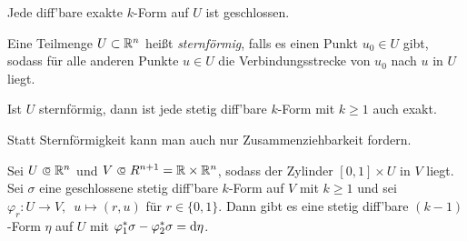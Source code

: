 \documentclass{cheat-sheet}
\begin{document}
\begin{beobachtung}
  Jede diff'bare exakte $k$-Form auf $U$ ist geschlossen.
\end{beobachtung}


\begin{defn}
  Eine Teilmenge $U \subset \mathbb{R}^n$ heißt \emph{sternförmig}, falls es einen Punkt $u_0 \in U$ gibt, sodass für alle anderen Punkte $u \in U$ die Verbindungsstrecke von $u_0$ nach $u$ in $U$ liegt.
\end{defn}

\begin{lem}[Poincaré]
  Ist $U$ sternförmig, dann ist jede stetig diff'bare $k$-Form mit $k \geq 1$ auch exakt.
\end{lem}

\begin{bem}
  Statt Sternförmigkeit kann man auch nur Zusammenziehbarkeit fordern.
\end{bem}


\begin{lem}
  Sei $U \opn \R^n$ und $V \opn R^{n{+}1} = \R \times \R^n$, sodass der Zylinder $[0,1] \times U$ in $V$ liegt. Sei $\sigma$ eine geschlossene stetig diff'bare $k$-Form auf $V$ mit $k \geq 1$ und sei $\varphi_r : U \to V, \enspace u \mapsto (r, u)$ für $r \in \{ 0, 1 \}$.
  Dann gibt es eine stetig diff'bare $(k{-}1)$-Form $\eta$ auf $U$ mit $\varphi_1^* \sigma - \varphi_2^* \sigma = \mathrm{d} \eta$.
\end{lem}
\end{document}

